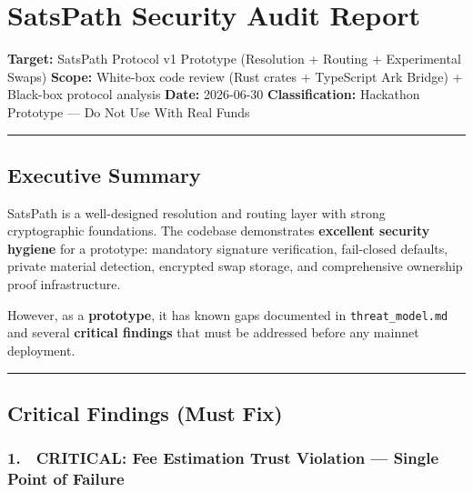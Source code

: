 \documentclass[
]{article}
\author{}
\date{}
\begin{document}
\hypertarget{satspath-security-audit-report}{%
\section{SatsPath Security Audit
Report}\label{satspath-security-audit-report}}

\textbf{Target:} SatsPath Protocol v1 Prototype (Resolution + Routing +
Experimental Swaps) \textbf{Scope:} White-box code review (Rust crates +
TypeScript Ark Bridge) + Black-box protocol analysis \textbf{Date:}
2026-06-30 \textbf{Classification:} Hackathon Prototype --- Do Not Use
With Real Funds

\begin{center}\rule{0.5\linewidth}{0.5pt}\end{center}

\hypertarget{executive-summary}{%
\subsection{Executive Summary}\label{executive-summary}}

SatsPath is a well-designed resolution and routing layer with strong
cryptographic foundations. The codebase demonstrates \textbf{excellent
security hygiene} for a prototype: mandatory signature verification,
fail-closed defaults, private material detection, encrypted swap
storage, and comprehensive ownership proof infrastructure.

However, as a \textbf{prototype}, it has known gaps documented in
\texttt{threat\_model.md} and several \textbf{critical findings} that
must be addressed before any mainnet deployment.

\begin{center}\rule{0.5\linewidth}{0.5pt}\end{center}

\hypertarget{critical-findings-must-fix}{%
\subsection{Critical Findings (Must
Fix)}\label{critical-findings-must-fix}}

\hypertarget{critical-fee-estimation-trust-violation-single-point-of-failure}{%
\subsubsection{1. 🔴 CRITICAL: Fee Estimation Trust Violation --- Single
Point of
Failure}\label{critical-fee-estimation-trust-violation-single-point-of-failure}}
\end{document}
